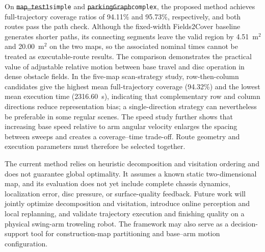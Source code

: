 \documentclass[a4paper,11pt]{article}
\makeatletter
\providecommand{\DIFaddtex}[1]{{\protect\color{blue}#1}} %
\providecommand{\DIFdeltex}[1]{{\protect\color{red}\sout{#1}}} %
\providecommand{\DIFaddbegin}{} %
\providecommand{\DIFaddend}{} %
\providecommand{\DIFdelbegin}{} %
\providecommand{\DIFdelend}{} %
\providecommand{\DIFadd}[1]{\texorpdfstring{\DIFaddtex{#1}}{#1}} %
\providecommand{\DIFdel}[1]{\texorpdfstring{\DIFdeltex{#1}}{}} %
\let\sout@orig\sout %
\renewcommand{\sout}[1]{\ifmmode\text{\sout@orig{\ensuremath{#1}}}\else\sout@orig{#1}\fi} %
\makeatother
\begin{document}
On \texttt{\DIFdelbegin \DIFdel{map\_test1}\DIFdelend \DIFaddbegin \DIFadd{simple}\DIFaddend } and \texttt{\DIFdelbegin \DIFdel{parkingGraph}\DIFdelend \DIFaddbegin \DIFadd{complex}\DIFaddend }, the proposed method achieves full-trajectory coverage ratios of 94.11\% and 95.73\%, respectively, and both routes pass the path check. Although the fixed-width Fields2Cover baseline generates shorter paths, its connecting segments leave the valid region by 4.51~m$^2$ and 20.00~m$^2$ on the two maps, so the associated nominal times cannot be treated as executable-route results. The comparison demonstrates the practical value of adjustable relative motion between base travel and disc operation in dense obstacle fields. In the five-map scan-strategy study, row-then-column candidates give the highest mean full-trajectory coverage (94.32\%) and the lowest mean execution time (2316.60~s), indicating that complementary row and column directions reduce representation bias; a single-direction strategy can nevertheless be preferable in some regular scenes. The speed study further shows that increasing base speed relative to arm angular velocity enlarges the spacing between sweeps and creates a coverage--time trade-off. Route geometry and execution parameters must therefore be selected together.

The current method relies on heuristic decomposition and visitation ordering and does not guarantee global optimality. It assumes a known static two-dimensional map, and its evaluation does not yet include complete chassis dynamics, localization error, disc pressure, or surface-quality feedback. Future work will jointly optimize decomposition and visitation, introduce online perception and local replanning, and validate trajectory execution and finishing quality on a physical swing-arm troweling robot. The framework may also serve as a decision-support tool for construction-map partitioning and base--arm motion configuration.


\nocite{*}

\begingroup
\small

\endgroup
\end{document}
